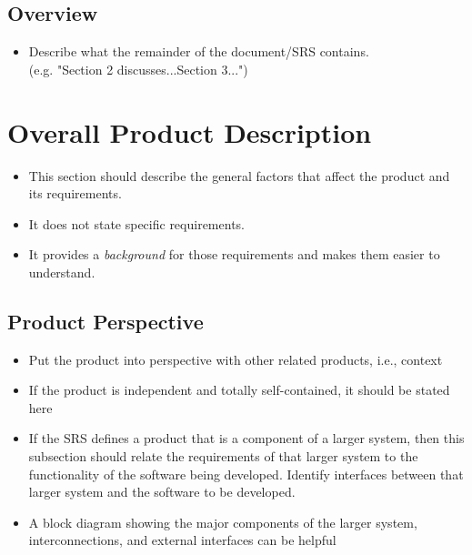\documentclass[]{article}
\begin{document}
\subsection{Overview}
\label{sub:overview}
\begin{itemize}
	\item Describe what the remainder of the document/SRS contains.\\
	(e.g. "Section 2 discusses...Section 3...")
\end{itemize}


\section{Overall Product Description}
\label{sec:overall_description}

\begin{itemize}
	\item This section should describe the general factors that affect the product and its requirements. 
	\item It does not state specific requirements.
	\item It provides a \emph{background} for those requirements and makes them easier to understand.
\end{itemize}


\subsection{Product Perspective}
\label{sub:product_perspective}
\begin{itemize}
	\item Put the product into perspective with other related products, i.e., context
	\item If the product is independent and totally self-contained, it should be stated here
	\item If the SRS defines a product that is a component of a larger system, then this subsection should relate the requirements of that larger system to the functionality of the software being developed. Identify interfaces between that larger system and the software to be developed.
	\item A block diagram showing the major components of the larger system, interconnections, and external interfaces can be helpful
\end{itemize}
\end{document}
